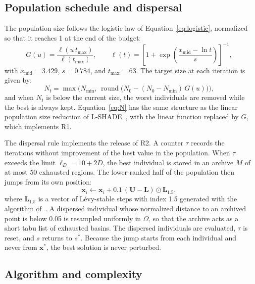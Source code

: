 \documentclass[preprint,12pt]{elsarticle}
\newcommand{\vx}{\mathbf{x}}
\begin{document}
\subsection{Population schedule and dispersal}
\label{sec:population}

The population size follows the logistic law of
Equation~\eqref{eq:logistic}, normalized so that it reaches 1 at the end of the
budget:
\begin{equation}
  G(u) = \frac{\ell(u\,t_{\max})}{\ell(t_{\max})},
  \qquad
  \ell(t) = \left[1 + \exp\!\left(\frac{x_{\mathrm{mid}} - \ln t}{s}\right)\right]^{-1},
  \label{eq:G}
\end{equation}
with $x_{\mathrm{mid}} = 3.429$, $s = 0.784$, and $t_{\max} = 63$. The target
size at each iteration is given by:
\begin{equation}
  N_t = \max\!\Big(N_{\min},\
  \operatorname{round}\big(N_0 - (N_0 - N_{\min})\,G(u)\big)\Big),
  \label{eq:N}
\end{equation}
and when $N_t$ is below the current size, the worst individuals are removed
while the best is always kept. Equation~\eqref{eq:N} has the same structure as
the linear population size reduction of L-SHADE~\cite{tanabe2014lshade}, with
the linear function replaced by $G$, which implements R1.

The dispersal rule implements the release of R2. A counter $\tau$ records the
iterations without improvement of the best value in the population. When
$\tau$ exceeds the limit $\ell_D = 10 + 2D$, the best individual is stored in
an archive $M$ of at most 50 exhausted regions. The lower-ranked half of the
population then jumps from its own position:
\begin{equation}
  \vx_i \leftarrow \vx_i + 0.1\,(\mathbf{U} - \mathbf{L}) \odot \mathbf{L}_{1.5},
  \label{eq:dispersal}
\end{equation}
where $\mathbf{L}_{1.5}$ is a vector of Lévy-stable steps with index 1.5
generated with the algorithm of~\cite{mantegna1994levy}. A dispersed
individual whose normalized distance to an archived point is below 0.05 is
resampled uniformly in $\Omega$, so that the archive acts as a short tabu list
of exhausted basins. The dispersed individuals are evaluated, $\tau$ is reset,
and $s$ returns to $s^{*}$. Because the jump starts from each individual and
never from $\vx^{*}$, the best solution is never perturbed.

\subsection{Algorithm and complexity}
\label{sec:complexity}
\end{document}
